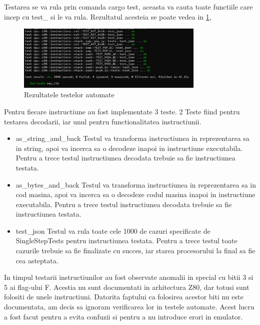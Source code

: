 \documentclass[titlepage,12pt]{article}
\DeclareRobustCommand{\code}[1]{{\ttfamily\small #1}}
\begin{document}
Testarea se va rula prin comanda \code{cargo test}, aceasta va cauta toate functiile care incep cu \code{test\_} si le va rula. Rezultatul acesteia se poate vedea in \cref{fig:testresults},

\begin{figure}[h!]
\centering
\includegraphics[width=0.8\textwidth]{images/testresults.png}
\caption{Rezultatele testelor automate}
\label{fig:testresults}
\end{figure}

Pentru fiecare instructiune au fost implementate 3 teste. 2 Teste fiind pentru testarea decodarii, iar unul pentru functionalitatea instructiunii.

\begin{itemize}
    \item {\code{as\_string\_and\_back}} Testul va transforma instructiunea in reprezentarea sa in string, apoi va incerca sa o decodeze inapoi in instructiune executabila. Pentru a trece testul instructiunea decodata trebuie sa fie instructiunea testata.
    \item {\code{as\_bytes\_and\_back}} Testul va transforma instructiunea in reprezentarea sa in cod masina, apoi va incerca sa o decodeze codul masina inapoi in instructiune executabila. Pentru a trece testul instructiunea decodata trebuie sa fie instructiunea testata.
    \item {\code{test\_json}} Testul va rula toate cele 1000 de cazuri specificate de SingleStepTests \cite {ref:singlesteptestsz80} pentru instructiunea testata. Pentru a trece testul toate cazurile trebuie sa fie finalizate cu succes, iar starea procesorului la final sa fie cea asteptata.
\end{itemize}

In timpul testarii instructiunilor au fost observate anomalii in special cu bitii 3 si 5 ai flag-ului F. Acestia nu sunt documentati in arhitectura Z80, dar totusi sunt folositi de unele instructiuni. Datorita faptului ca folosirea acestor biti nu este documentata, am decis sa ignoram verificarea lor in testele automate. Acest lucru a fost facut pentru a evita confuzii si pentru a nu introduce erori in emulator.
\end{document}
